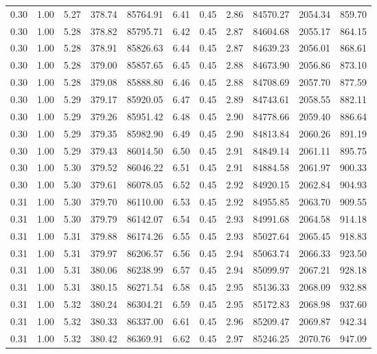 \begin{table}[!ht]
\begin{tabular}{rrrrrrrrrrr}
0.30 & 1.00 & 5.27 & 378.74 & 85764.91 & 6.41 & 0.45 & 2.86 & 84570.27 & 2054.34 & 859.70 \\
0.30 & 1.00 & 5.28 & 378.82 & 85795.71 & 6.42 & 0.45 & 2.87 & 84604.68 & 2055.17 & 864.15 \\
0.30 & 1.00 & 5.28 & 378.91 & 85826.63 & 6.44 & 0.45 & 2.87 & 84639.23 & 2056.01 & 868.61 \\
0.30 & 1.00 & 5.28 & 379.00 & 85857.65 & 6.45 & 0.45 & 2.88 & 84673.90 & 2056.86 & 873.10 \\
0.30 & 1.00 & 5.28 & 379.08 & 85888.80 & 6.46 & 0.45 & 2.88 & 84708.69 & 2057.70 & 877.59 \\
0.30 & 1.00 & 5.29 & 379.17 & 85920.05 & 6.47 & 0.45 & 2.89 & 84743.61 & 2058.55 & 882.11 \\
0.30 & 1.00 & 5.29 & 379.26 & 85951.42 & 6.48 & 0.45 & 2.90 & 84778.66 & 2059.40 & 886.64 \\
0.30 & 1.00 & 5.29 & 379.35 & 85982.90 & 6.49 & 0.45 & 2.90 & 84813.84 & 2060.26 & 891.19 \\
0.30 & 1.00 & 5.29 & 379.43 & 86014.50 & 6.50 & 0.45 & 2.91 & 84849.14 & 2061.11 & 895.75 \\
0.30 & 1.00 & 5.30 & 379.52 & 86046.22 & 6.51 & 0.45 & 2.91 & 84884.58 & 2061.97 & 900.33 \\
0.30 & 1.00 & 5.30 & 379.61 & 86078.05 & 6.52 & 0.45 & 2.92 & 84920.15 & 2062.84 & 904.93 \\
0.31 & 1.00 & 5.30 & 379.70 & 86110.00 & 6.53 & 0.45 & 2.92 & 84955.85 & 2063.70 & 909.55 \\
0.31 & 1.00 & 5.30 & 379.79 & 86142.07 & 6.54 & 0.45 & 2.93 & 84991.68 & 2064.58 & 914.18 \\
0.31 & 1.00 & 5.31 & 379.88 & 86174.26 & 6.55 & 0.45 & 2.93 & 85027.64 & 2065.45 & 918.83 \\
0.31 & 1.00 & 5.31 & 379.97 & 86206.57 & 6.56 & 0.45 & 2.94 & 85063.74 & 2066.33 & 923.50 \\
0.31 & 1.00 & 5.31 & 380.06 & 86238.99 & 6.57 & 0.45 & 2.94 & 85099.97 & 2067.21 & 928.18 \\
0.31 & 1.00 & 5.31 & 380.15 & 86271.54 & 6.58 & 0.45 & 2.95 & 85136.33 & 2068.09 & 932.88 \\
0.31 & 1.00 & 5.32 & 380.24 & 86304.21 & 6.59 & 0.45 & 2.95 & 85172.83 & 2068.98 & 937.60 \\
0.31 & 1.00 & 5.32 & 380.33 & 86337.00 & 6.61 & 0.45 & 2.96 & 85209.47 & 2069.87 & 942.34 \\
0.31 & 1.00 & 5.32 & 380.42 & 86369.91 & 6.62 & 0.45 & 2.97 & 85246.25 & 2070.76 & 947.09 \\

\end{tabular}
\end{table}

